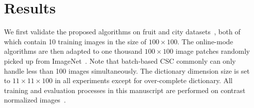 \section{Results} \label{sec:result}
We first validate the proposed algorithms on fruit and city datasets~\cite{zeiler2010deconvolutional}, both of which contain 10 training images in the size of $100 \times 100$. The online-mode algorithms are then adapted to one thousand $100 \times 100$ image patches randomly picked up from ImageNet~\cite{deng2009imagenet}. Note that batch-based CSC commonly can only handle less than 100 images simultaneously. The dictionary dimension size is set to $11 \times 11 \times 100$ in all experiments except for over-complete dictionary. All training and evaluation processes in this manuscript are performed on contrast normalized images~\cite{zeiler2010deconvolutional,heide2015fast}.

